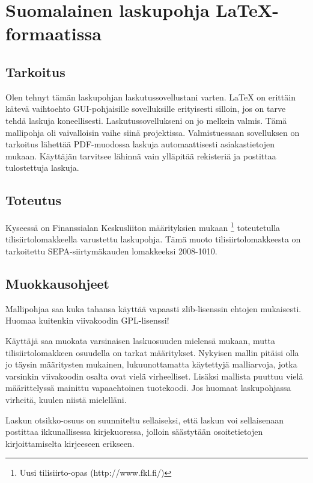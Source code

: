 \documentclass[a4paper,12pt]{article}
\date{23.02.2008}
\begin{document}
\section{Suomalainen laskupohja \LaTeX-formaatissa}

\subsection{Tarkoitus}

Olen tehnyt tämän laskupohjan laskutussovellustani varten. \LaTeX{} on erittäin 
kätevä vaihtoehto GUI-pohjaisille sovelluksille erityisesti silloin, jos on 
tarve tehdä laskuja koneellisesti. Laskutussovellukseni on jo melkein valmis. 
Tämä mallipohja oli vaivalloisin vaihe siinä projektissa. Valmistuessaan 
sovelluksen on tarkoitus lähettää PDF-muodossa laskuja automaattisesti 
asiakastietojen mukaan. Käyttäjän tarvitsee lähinnä vain ylläpitää rekisteriä 
ja postittaa tulostettuja laskuja.

\subsection{Toteutus}

Kyseessä on Finanssialan Keskusliiton määrityksien mukaan \footnote{Uusi 
tilisiirto-opas (http://www.fkl.fi/)} toteutetulla tilisiirtolomakkeella 
varustettu laskupohja. Tämä muoto tilisiirtolomakkeesta on tarkoitettu 
SEPA-siirtymäkauden lomakkeeksi 2008-1010.

\subsection{Muokkausohjeet}

Mallipohjaa saa kuka tahansa käyttää vapaasti zlib-lisenssin ehtojen 
mukaisesti. Huomaa kuitenkin viivakoodin GPL-lisenssi!

Käyttäjä saa muokata varsinaisen laskuosuuden mielensä mukaan, mutta 
tilisiirtolomakkeen osuudella on tarkat määritykset. Nykyisen mallin pitäisi 
olla jo täysin määritysten mukainen, lukuunottamatta käytettyjä malliarvoja, 
jotka varsinkin viivakoodin osalta ovat vielä virheelliset. Lisäksi mallista 
puuttuu vielä määrittelyssä mainittu vapaaehtoinen tuotekoodi. Jos huomaat 
laskupohjassa virheitä, kuulen niistä mielelläni.

Laskun otsikko-osuus on suunniteltu sellaiseksi, että laskun voi sellaisenaan 
postittaa ikkunallisessa kirjekuoressa, jolloin säästytään osoitetietojen 
kirjoittamiselta kirjeeseen erikseen.
\end{document}

